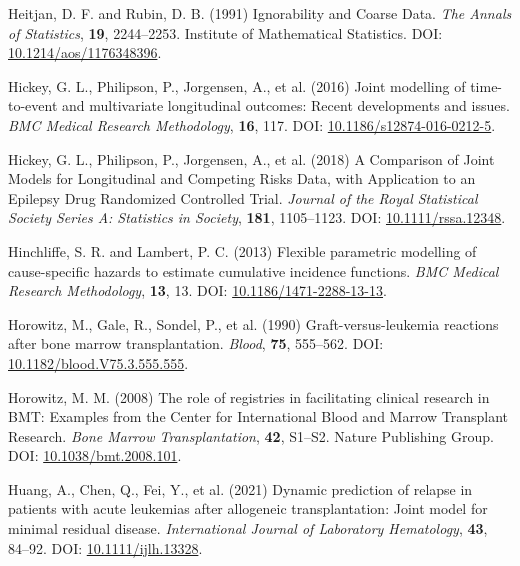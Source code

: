 \documentclass[
  letterpaper,
  paper=240mm:170mm,
  twoside=true,
  open=right,
  fontsize=10pt,
  pagesize=false,
  BCOR=15mm,
  DIV=14,
  headinclude=true,
  footinclude=false,
  headsepline=on]{scrbook}
\newlength{\cslhangindent}
\newenvironment{CSLReferences}[2] %
 {\begin{list}{}{%
  \setlength{\itemindent}{0pt}
  \setlength{\leftmargin}{0pt}
  \setlength{\parsep}{0pt}
  \ifodd #1
   \setlength{\leftmargin}{\cslhangindent}
   \setlength{\itemindent}{-1\cslhangindent}
  \fi
  \setlength{\itemsep}{#2\baselineskip}}}
 {\end{list}}
\begin{document}
\begin{CSLReferences}{1}{1}
Heitjan, D. F. and Rubin, D. B. (1991) Ignorability and {Coarse Data}.
\emph{The Annals of Statistics}, \textbf{19}, 2244--2253. Institute of
Mathematical Statistics. DOI:
\href{https://doi.org/10.1214/aos/1176348396}{10.1214/aos/1176348396}.

Hickey, G. L., Philipson, P., Jorgensen, A., et al. (2016) Joint
modelling of time-to-event and multivariate longitudinal outcomes:
Recent developments and issues. \emph{BMC Medical Research Methodology},
\textbf{16}, 117. DOI:
\href{https://doi.org/10.1186/s12874-016-0212-5}{10.1186/s12874-016-0212-5}.

Hickey, G. L., Philipson, P., Jorgensen, A., et al. (2018) A
{Comparison} of {Joint Models} for {Longitudinal} and {Competing Risks
Data}, with {Application} to an {Epilepsy Drug Randomized Controlled
Trial}. \emph{Journal of the Royal Statistical Society Series A:
Statistics in Society}, \textbf{181}, 1105--1123. DOI:
\href{https://doi.org/10.1111/rssa.12348}{10.1111/rssa.12348}.

Hinchliffe, S. R. and Lambert, P. C. (2013) Flexible parametric
modelling of cause-specific hazards to estimate cumulative incidence
functions. \emph{BMC Medical Research Methodology}, \textbf{13}, 13.
DOI:
\href{https://doi.org/10.1186/1471-2288-13-13}{10.1186/1471-2288-13-13}.

Horowitz, M., Gale, R., Sondel, P., et al. (1990) Graft-versus-leukemia
reactions after bone marrow transplantation. \emph{Blood}, \textbf{75},
555--562. DOI:
\href{https://doi.org/10.1182/blood.V75.3.555.555}{10.1182/blood.V75.3.555.555}.

Horowitz, M. M. (2008) The role of registries in facilitating clinical
research in {BMT}: Examples from the {Center} for {International Blood}
and {Marrow Transplant Research}. \emph{Bone Marrow Transplantation},
\textbf{42}, S1--S2. Nature Publishing Group. DOI:
\href{https://doi.org/10.1038/bmt.2008.101}{10.1038/bmt.2008.101}.

Huang, A., Chen, Q., Fei, Y., et al. (2021) Dynamic prediction of
relapse in patients with acute leukemias after allogeneic
transplantation: {Joint} model for minimal residual disease.
\emph{International Journal of Laboratory Hematology}, \textbf{43},
84--92. DOI:
\href{https://doi.org/10.1111/ijlh.13328}{10.1111/ijlh.13328}.


\end{CSLReferences}
\end{document}
